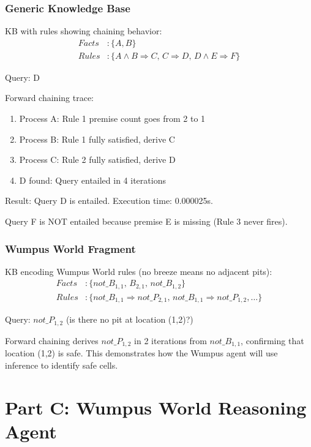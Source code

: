 \documentclass[letterpaper]{article}
\begin{document}
\subsubsection{Generic Knowledge Base}

KB with rules showing chaining behavior:
\begin{align*}
Facts &: \{A, B\}\\
Rules &: \{A \wedge B \Rightarrow C, \, C \Rightarrow D, \, D \wedge E \Rightarrow F\}
\end{align*}

Query: D

Forward chaining trace:
\begin{enumerate}
\item Process A: Rule 1 premise count goes from 2 to 1
\item Process B: Rule 1 fully satisfied, derive C
\item Process C: Rule 2 fully satisfied, derive D
\item D found: Query entailed in 4 iterations
\end{enumerate}

Result: Query D is entailed. Execution time: 0.000025s.

Query F is NOT entailed because premise E is missing (Rule 3 never fires).

\subsubsection{Wumpus World Fragment}

KB encoding Wumpus World rules (no breeze means no adjacent pits):
\begin{align*}
Facts &: \{not\_B_{1,1}, \, B_{2,1}, \, not\_B_{1,2}\}\\
Rules &: \{not\_B_{1,1} \Rightarrow not\_P_{2,1}, \, not\_B_{1,1} \Rightarrow not\_P_{1,2}, \ldots\}
\end{align*}

Query: $not\_P_{1,2}$ (is there no pit at location (1,2)?)

Forward chaining derives $not\_P_{1,2}$ in 2 iterations from $not\_B_{1,1}$, confirming that location (1,2) is safe. This demonstrates how the Wumpus agent will use inference to identify safe cells.

\section{Part C: Wumpus World Reasoning Agent}
\end{document}
